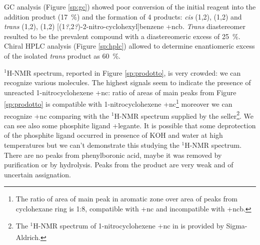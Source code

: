 GC analysis (Figure \ref{sp:gc}) showed poor conversion of the initial reagent into the addition product (17~\%) and the formation of 4 products: \emph{cis} (1\rS,2\rS), (1\Rs,2\Rs) and \emph{trans} (1\rS,2\Rs), (1\Rs,2\rS) [(1{\slshape ?},2{\slshape ?})-2-nitro-cyclo\-hexyl]benzene \cmpd+{ncb}.
\emph{Trans} diastereomer resulted to be the prevalent compound with a diastereo\-meric excess of 25~\%. Chiral HPLC analysis (Figure \ref{sp:hplc}) allowed to determine enantiomeric excess of the isolated \emph{trans} product as 60~\%. 

$^{1}$H-NMR spectrum, reported in Figure \ref{sp:prodotto}, is very crowded: we can recognize various molecules. The highest signals seem to indicate the presence of un\-reacted 1-nitro\-cyclo\-hexene \cmpd+{nc}: ratio of areas of main peaks from Figure \ref{sp:prodotto} is compatible with 1-nitro\-cyclo\-hexene \cmpd+{nc}\footnote{The ratio of area of main peak in aromatic zone over area of peaks from cyclohexane ring is 1:8, compatible with \cmpd+{nc} and incompatible with \cmpd+{ncb}.} moreover we can recognize \cmpd+{nc} comparing with the $^1$H-NMR spectrum supplied by the seller\footnote{The $^1$H-NMR spectrum of 1-nitro\-cyclo\-hexene \cmpd+{nc} in  is provided by Sigma-Aldrich\textsuperscript{\textregistered}.}. 
We can see also some phosphite ligand \cmpd+{legante}. It is possible that some de\-protection of the phosphite ligand occurred in presence of KOH and water at high temperatures but we can't demonstrate this studying the $^{1}$H-NMR spectrum. There are no peaks from phenyl\-boronic acid, maybe it was removed by purification or by hydrolysis. Peaks from the product are very weak and of uncertain assignation. 



